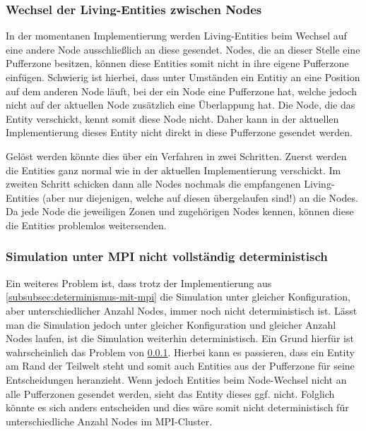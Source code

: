 \documentclass[course=erap]{aspdoc}
\begin{document}
\subsubsection{Wechsel der Living-Entities zwischen Nodes}
\label{subsubsec:todo-entity-node-change}
In der momentanen Implementierung werden Living-Entities beim Wechsel auf eine andere Node ausschließlich an diese gesendet. Nodes, die an dieser Stelle eine Pufferzone besitzen, können diese Entities somit nicht in ihre eigene Pufferzone einfügen. Schwierig ist hierbei, dass unter Umständen ein Entitiy an eine Position auf dem anderen Node läuft, bei der ein Node eine Pufferzone hat, welche jedoch nicht auf der aktuellen Node zusätzlich eine Überlappung hat. Die Node, die das Entity verschickt, kennt somit diese Node nicht. Daher kann in der aktuellen Implementierung dieses Entity nicht direkt in diese Pufferzone gesendet werden.

Gelöst werden könnte dies über ein Verfahren in zwei Schritten. Zuerst werden die Entities ganz normal wie in der aktuellen Implementierung verschickt. Im zweiten Schritt schicken dann alle Nodes nochmals die empfangenen Living-Entities (aber nur diejenigen, welche auf diesen übergelaufen sind!) an die Nodes. Da jede Node die jeweiligen Zonen und zugehörigen Nodes kennen, können diese die Entities problemlos weitersenden.


\subsubsection{Simulation unter MPI nicht vollständig deterministisch}
Ein weiteres Problem ist, dass trotz der Implementierung aus \ref{subsubsec:determinismus-mit-mpi} die Simulation unter gleicher Konfiguration, aber unterschiedlicher Anzahl Nodes, immer noch nicht deterministisch ist. Lässt man die Simulation jedoch unter gleicher Konfiguration und gleicher Anzahl Nodes laufen, ist die Simulation weiterhin deterministisch. Ein Grund hierfür ist wahrscheinlich das Problem von \ref{subsubsec:todo-entity-node-change}. Hierbei kann es passieren, dass ein Entity am Rand der Teilwelt steht und somit auch Entities aus der Pufferzone für seine Entscheidungen heranzieht. Wenn jedoch Entities beim Node-Wechsel nicht an alle Pufferzonen gesendet werden, sieht das Entity dieses ggf. nicht. Folglich könnte es sich anders entscheiden und dies wäre somit nicht deterministisch für unterschiedliche Anzahl Nodes im MPI-Cluster.
\end{document}
